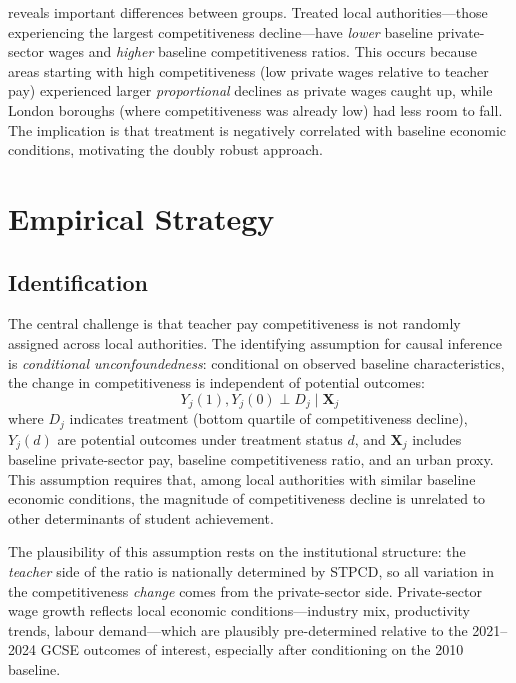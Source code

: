 \documentclass[12pt]{article}
\begin{document}
 reveals important differences between groups. Treated local authorities---those experiencing the largest competitiveness decline---have \textit{lower} baseline private-sector wages and \textit{higher} baseline competitiveness ratios. This occurs because areas starting with high competitiveness (low private wages relative to teacher pay) experienced larger \textit{proportional} declines as private wages caught up, while London boroughs (where competitiveness was already low) had less room to fall. The implication is that treatment is negatively correlated with baseline economic conditions, motivating the doubly robust approach.

\section{Empirical Strategy}\label{sec:strategy}

\subsection{Identification}

The central challenge is that teacher pay competitiveness is not randomly assigned across local authorities. The identifying assumption for causal inference is \textit{conditional unconfoundedness}: conditional on observed baseline characteristics, the change in competitiveness is independent of potential outcomes:
\begin{equation}
Y_j(1), Y_j(0) \perp D_j \mid \mathbf{X}_j
\end{equation}
where $D_j$ indicates treatment (bottom quartile of competitiveness decline), $Y_j(d)$ are potential outcomes under treatment status $d$, and $\mathbf{X}_j$ includes baseline private-sector pay, baseline competitiveness ratio, and an urban proxy. This assumption requires that, among local authorities with similar baseline economic conditions, the magnitude of competitiveness decline is unrelated to other determinants of student achievement.

The plausibility of this assumption rests on the institutional structure: the \textit{teacher} side of the ratio is nationally determined by STPCD, so all variation in the competitiveness \textit{change} comes from the private-sector side. Private-sector wage growth reflects local economic conditions---industry mix, productivity trends, labour demand---which are plausibly pre-determined relative to the 2021--2024 GCSE outcomes of interest, especially after conditioning on the 2010 baseline.
\end{document}
